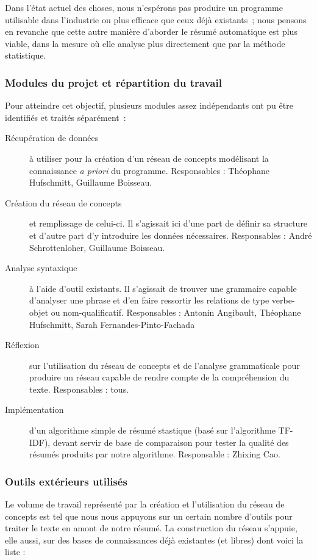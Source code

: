 \documentclass[a4paper,12pt]{article}
\begin{document}
Dans l'état actuel des choses, nous n'espérons pas produire un programme utilisable dans l'industrie ou plus efficace que ceux déjà existants~; nous pensons en revanche que cette autre manière d'aborder le résumé automatique est plus viable, dans la mesure où elle analyse plus directement que par la méthode statistique.

\subsubsection{Modules du projet et répartition du travail}
Pour atteindre cet objectif, plusieurs modules assez indépendants ont pu être identifiés et traités séparément~:

\begin{description}
	\item[R\'ecup\'eration de donn\'ees] à utiliser pour la création d'un réseau de concepts modélisant la connaissance \textit{a priori} du programme. Responsables : Théophane Hufschmitt, Guillaume Boisseau.
	\item[Création du réseau de concepts] et remplissage de celui-ci. Il s'agissait ici d'une part de définir sa structure et d'autre part d'y introduire les données nécessaires. Responsables : André Schrottenloher, Guillaume Boisseau.
	\item[Analyse syntaxique] à l'aide d'outil existants. Il s'agissait de trouver une grammaire capable d'analyser une phrase et d'en faire ressortir les relations de type verbe-objet ou nom-qualificatif. Responsables : Antonin Angibault, Théophane Hufschmitt, Sarah Fernandes-Pinto-Fachada
	\item[Réflexion] sur l'utilisation du réseau de concepts et de l'analyse grammaticale pour produire un réseau capable de rendre compte de la compréhension du texte. Responsables : tous.
	\item[Implémentation] d'un algorithme simple de résumé stastique (basé sur l'algorithme TF-IDF), devant servir de base de comparaison pour tester la qualité des résumés produits par notre algorithme.  Responsable : Zhixing Cao. 
\end{description}

\subsubsection{Outils extérieurs utilisés}

Le volume de travail représenté par la création et l'utilisation du réseau de concepts est tel que nous nous appuyons sur un certain nombre d'outils pour traiter le texte en amont de notre résumé. La construction du réseau s'appuie, elle aussi, sur des bases de connaissances déjà existantes (et libres) dont voici la liste :
\end{document}
